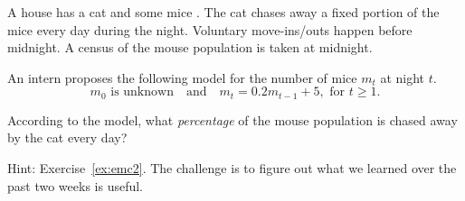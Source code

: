 \documentclass[../main.tex]{subfiles}
\begin{document}
\begin{exercise} \label{ex:recurrence-cat-and-mice}
  A house has a cat and some mice . The cat chases away a fixed portion of the mice every day during the night.  Voluntary move-ins/outs happen before midnight. A census of the mouse population is taken at midnight.

  An intern proposes the following model for the number of mice \(m_{t}\) at night \(t\).
  \[
    m_{0} \text{ is unknown} \quad\text{and}\quad m_{t} = 0.2 m_{t-1} + 5, \text{ for \(t \ge 1\)}.
  \]

  According to the model, what \emph{percentage} of the mouse population is chased away by the cat every day?

  {\footnotesize Hint: Exercise~\ref{ex:emc2}. The challenge is to figure out what we learned over the past two weeks is useful.}
\end{exercise}
\end{document}
